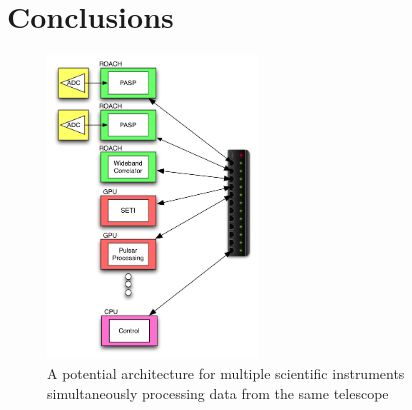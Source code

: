 \chapter{Conclusions}


\begin{figure}[ht!]
  \centering
    \includegraphics[width=0.5\textwidth]{Images/C5/universal_arch.png}
  \caption{A potential architecture for multiple scientific instruments simultaneously processing data from the same telescope}
  \label{fig: C5/universal_arch.png}
\end{figure}